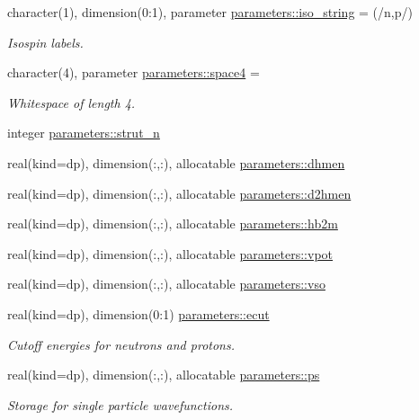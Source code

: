 \begin{DoxyCompactItemize}
character(1), dimension(0\+:1), parameter \mbox{\hyperlink{group__STRINGS_gaa642f410416bdb397b62d3844df96d6c}{parameters\+::iso\+\_\+string}} = (/\textquotesingle{}n\textquotesingle{},\textquotesingle{}p\textquotesingle{}/)
\begin{DoxyCompactList}\small\item\em Isospin labels. \end{DoxyCompactList}\item 
character(4), parameter \mbox{\hyperlink{group__STRINGS_ga0f73a365fff78bef9c51e7b776ab6184}{parameters\+::space4}} = \textquotesingle{} \textquotesingle{}
\begin{DoxyCompactList}\small\item\em Whitespace of length 4. \end{DoxyCompactList}\item 
integer \mbox{\hyperlink{group__STRUTINSKY_gac439f84f31aadb3d8940c87b8031f3c5}{parameters\+::strut\+\_\+n}}
\item 
real(kind=dp), dimension(\+:,\+:), allocatable \mbox{\hyperlink{group__STRUTINSKY_ga5b0cdd0835c3f087c5da53f73ad08bf3}{parameters\+::dhmen}}
\item 
real(kind=dp), dimension(\+:,\+:), allocatable \mbox{\hyperlink{group__STRUTINSKY_ga51f921a516a9571cb7f002e059909a30}{parameters\+::d2hmen}}
\item 
real(kind=dp), dimension(\+:,\+:), allocatable \mbox{\hyperlink{group__STRUTINSKY_ga4faafec43e7b862ce36b7c191f7a5b72}{parameters\+::hb2m}}
\item 
real(kind=dp), dimension(\+:,\+:), allocatable \mbox{\hyperlink{group__STRUTINSKY_gab6a00a0a328c2e57dbb345301d691e78}{parameters\+::vpot}}
\item 
real(kind=dp), dimension(\+:,\+:), allocatable \mbox{\hyperlink{group__STRUTINSKY_gaf3ea0455435866d9d7095b02b9e40436}{parameters\+::vso}}
\item 
real(kind=dp), dimension(0\+:1) \mbox{\hyperlink{group__STRUTINSKY_gad6c6de2d2e65ad858f92af1a84c8b24b}{parameters\+::ecut}}
\begin{DoxyCompactList}\small\item\em Cutoff energies for neutrons and protons. \end{DoxyCompactList}\item 
real(kind=dp), dimension(\+:,\+:), allocatable \mbox{\hyperlink{group__STRUTINSKY_gace20a26f9d6d1c052703baf791c04716}{parameters\+::ps}}
\begin{DoxyCompactList}\small\item\em Storage for single particle wavefunctions. \end{DoxyCompactList}\item 

\end{DoxyCompactItemize}
